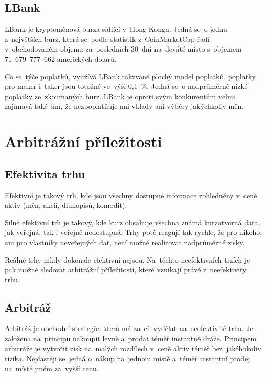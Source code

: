 \documentclass[thesis=B,czech]{FITthesis}[2019/03/21]
\begin{document}
\subsection{LBank}
LBank je kryptoměnová burza sídlící v~Hong Kongu. Jedná se~o jednu \linebreak z~největších burz, která se~podle statistik z~CoinMarketCap řadí v~obchodovaném objemu za~posledních 30~dní na~deváté místo s~objemem 71~679~777~662 amerických dolarů. \cite{coinmarketcap} \cite{cryptowisser_lbank}

Co se~týče poplatků, využívá LBank takzvaně plochý model poplatků, poplatky pro maker i~taker jsou totožné ve~výši 0,1~\%. Jedná se~o nadprůměrně nízké poplatky ze~zkoumaných burz. LBank je oproti svým konkurentům velmi zajímavá také tím, že nezpoplatňuje ani vklady ani výběry jakýchkoliv měn. \cite{cryptowisser_lbank}


\section{Arbitrážní příležitosti}
\subsection{Efektivita trhu}
Efektivní je takový trh, kde jsou všechny dostupné informace zohledněny v~ceně aktiv (měn, akcií, dluhopisů, komodit). \cite{efektivita_trhu}

Silně efektivní trh je takový, kde kurz obsahuje všechna známá kurzotvorná data, jak veřejná, tak i veřejně nedostupná. Trhy poté reagují tak rychle, že pro nikoho, ani pro vlastníky neveřejných dat, není možné realizovat nadprůměrné zisky. \cite{efektivnost_trhu}

Reálné trhy nikdy dokonale efektivní nejsou. Na~těchto neefektivních trzích je pak možné sledovat arbitrážní příležitosti, které vznikají právě z~neefektivity trhu. \cite{pecev, what_is_arbitage} 

\subsection{Arbitráž}
Arbitráž je obchodní strategie, která má za~cíl vydělat na~neefektivitě trhu. Je založena na~principu nakoupit levně a~prodat téměř instantně dráže. Principem arbitráže je vytvořit zisk na~malých rozdílech v~ceně aktiv téměř bez~jakéhokoliv rizika. Nejčastěji se~jedná o~nákup na~jednom místě a~téměř instantní prodej na~místě jiném za~vyšší cenu. \cite{Capital}
\end{document}
